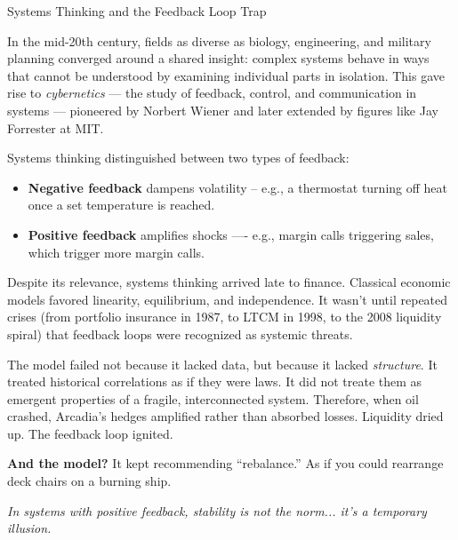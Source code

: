 \begin{PhilosophicalSidebar}{Systems Thinking and the Feedback Loop Trap}

  In the mid-20th century, fields as diverse as biology, engineering, and military planning converged 
  around a shared insight: complex systems behave in ways that cannot be understood by examining individual 
  parts in isolation. This gave rise to \textit{cybernetics} — the study of feedback, control, and 
  communication in systems — pioneered by Norbert Wiener and later extended by figures like Jay Forrester 
  at MIT.

  \medskip
  
  Systems thinking distinguished between two types of feedback:  

  \medskip

  \begin{itemize}
    \item \textbf{Negative feedback} dampens volatility -- e.g., a thermostat turning off heat once a set 
    temperature is reached.  
    \item \textbf{Positive feedback} amplifies shocks —- e.g., margin calls triggering sales, which trigger 
    more margin calls.
  \end{itemize}

  \medskip
  
  Despite its relevance, systems thinking arrived late to finance. Classical economic models favored 
  linearity, equilibrium, and independence. It wasn’t until repeated crises (from portfolio insurance in 
  1987, to LTCM in 1998, to the 2008 liquidity spiral) that feedback loops were recognized as systemic threats.

  \medskip
  
  The model failed not because it lacked data, but because it lacked \textit{structure}. It treated 
  historical correlations as if they were laws. It did not treate them as emergent properties of a fragile, 
  interconnected system. Therefore, when oil crashed, Arcadia’s hedges amplified rather than absorbed losses. 
  Liquidity dried up.  The feedback loop ignited.  

  \medskip
  
  \textbf{And the model?}  
  It kept recommending ``rebalance.''
  As if you could rearrange deck chairs on a burning ship.
  
  \medskip

  \begin{center}
  \textit{In systems with positive feedback, stability is not the norm... it’s a temporary illusion.}
  \end{center}
  
\end{PhilosophicalSidebar}

